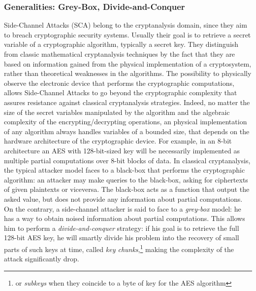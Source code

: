 \subsubsection{Generalities: Grey-Box, Divide-and-Conquer}
Side-Channel Attacks (SCA) belong to the cryptanalysis domain, since they aim to breach cryptographic security systems. Usually their goal is to retrieve a secret variable of a cryptographic algorithm, typically a secret key. They distinguish from classic mathematical cryptanalysis techniques by the fact that they are based on information gained from the physical implementation of a cryptosystem, rather than theoretical weaknesses in the algorithms. 
The possibility to physically observe the electronic device that performs the cryptographic computations, allows Side-Channel Attacks to go beyond the cryptographic complexity that assures resistance against classical cryptanalysis strategies.  Indeed, no matter the size of the secret variables manipulated by the algorithm and the algebraic complexity of the encrypting/decrypting operations, an physical implementation of any algorithm always handles variables of a bounded size, that depends on the hardware architecture of the cryptographic device. For example, in an 8-bit architecture an AES with 128-bit-sized key will be necessarily implemented as multiple partial computations over 8-bit blocks of data. In classical cryptanalysis, the typical attacker model faces to a black-box that performs the cryptographic algorithm: an attacker may make queries to the black-box, asking for ciphertexts of given plaintexts or viceversa. The black-box acts as a function that output the asked value, but does not provide any information about partial computations. On the contrary, a side-channel attacker is said to face to a \emph{grey-box} model: he has a way to obtain noised information about partial computations. This allows him to perform a \emph{divide-and-conquer} strategy: if his goal is to retrieve the full 128-bit AES key, he will smartly divide his problem into the recovery of small parts of such keys at time, called \emph{key chunks},\footnote{or \emph{subkeys} when they coincide to a byte of key for the AES algorithm} making the complexity of the attack significantly drop. 

